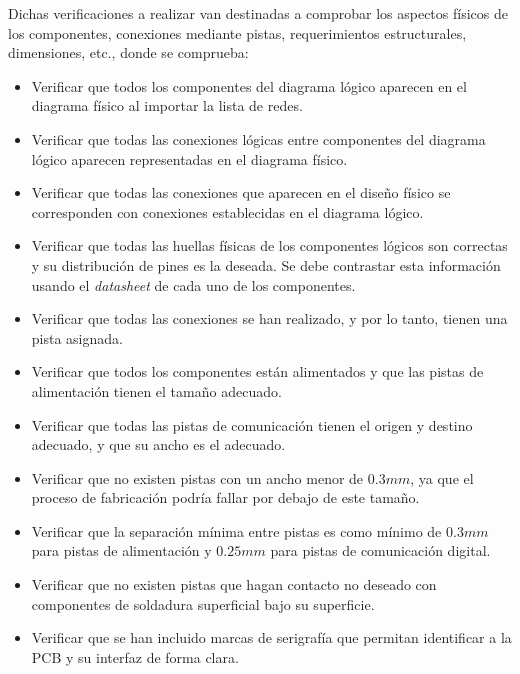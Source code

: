 Dichas verificaciones a realizar van destinadas a comprobar los aspectos físicos de los componentes, conexiones mediante pistas, requerimientos estructurales, dimensiones, etc., donde se comprueba:
\begin{itemize}
    \item Verificar que todos los componentes del diagrama lógico aparecen en el diagrama físico al importar la lista de redes.
    
    \item Verificar que todas las conexiones lógicas entre componentes del diagrama lógico aparecen representadas en el diagrama físico.
    
    \item Verificar que todas las conexiones que aparecen en el diseño físico se corresponden con conexiones establecidas en el diagrama lógico.
    
    \item Verificar que todas las huellas físicas de los componentes lógicos son correctas y su distribución de pines es la deseada. Se debe contrastar esta información usando el \textit{datasheet} de cada uno de los componentes.
    
    \item Verificar que todas las conexiones se han realizado, y por lo tanto, tienen una pista asignada.
    
    \item Verificar que todos los componentes están alimentados y que las pistas de alimentación tienen el tamaño adecuado.
    
    \item Verificar que todas las pistas de comunicación tienen el origen y destino adecuado, y que su ancho es el adecuado.
    
    \item Verificar que no existen pistas con un ancho menor de $0.3mm$, ya que el proceso de fabricación podría fallar por debajo de este tamaño.
    
    \item Verificar que la separación mínima entre pistas es como mínimo de $0.3mm$ para pistas de alimentación y $0.25mm$ para pistas de comunicación digital.
    
    \item Verificar que no existen pistas que hagan contacto no deseado con componentes de soldadura superficial bajo su superficie.
    
    \item Verificar que se han incluido marcas de serigrafía que permitan identificar a la \ac{PCB} y su interfaz de forma clara.
    

\end{itemize}

